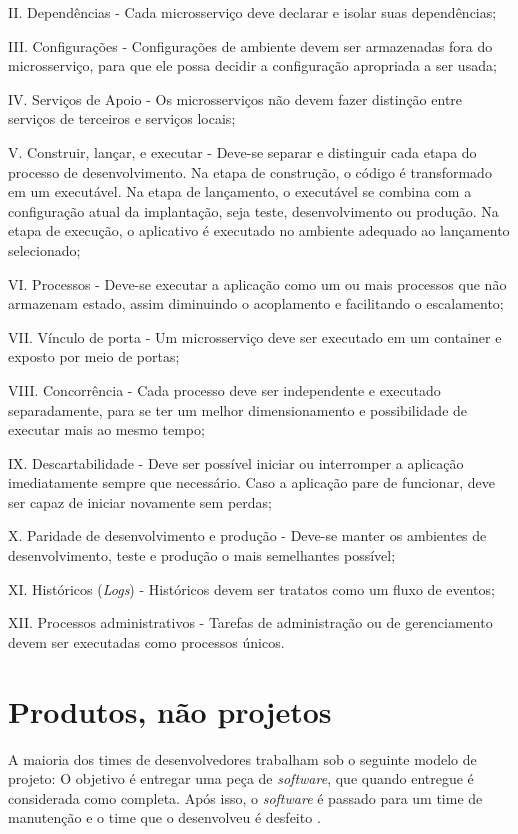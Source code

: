 II. Dependências - Cada microsserviço deve declarar e isolar suas dependências;

III. Configurações - Configurações de ambiente devem ser armazenadas fora do microsserviço, para que ele possa decidir a configuração apropriada a ser usada;

IV. Serviços de Apoio - Os microsserviços não devem fazer distinção entre serviços de terceiros e serviços locais;

V. Construir, lançar, e executar - Deve-se separar e distinguir cada etapa do processo de desenvolvimento. Na etapa de construção, o código é transformado em um executável. Na etapa de lançamento, o executável se combina com a configuração atual da implantação, seja teste, desenvolvimento ou produção. Na etapa de execução, o aplicativo é executado no ambiente adequado ao lançamento selecionado;

VI. Processos - Deve-se executar a aplicação como um ou mais processos que não armazenam estado, assim diminuindo o acoplamento e facilitando o escalamento;

VII. Vínculo de porta - Um microsserviço deve ser executado em um container e exposto por meio de portas;

VIII. Concorrência - Cada processo deve ser independente e executado separadamente, para se ter um melhor dimensionamento e possibilidade de executar mais ao mesmo tempo;

IX. Descartabilidade - Deve ser possível iniciar ou interromper a aplicação imediatamente sempre que necessário. Caso a aplicação pare de funcionar, deve ser capaz de iniciar novamente sem perdas;

X. Paridade de desenvolvimento e produção - Deve-se manter os ambientes de desenvolvimento, teste e produção o mais semelhantes possível;

XI. Históricos (\emph{Logs}) - Históricos devem ser tratatos como um fluxo de eventos;

XII. Processos administrativos - Tarefas de administração ou de gerenciamento devem ser executadas como processos únicos.

\section{Produtos, não projetos}

A maioria dos times de desenvolvedores trabalham sob o seguinte modelo de projeto: O objetivo é entregar uma peça de \emph{software}, que quando entregue é considerada como completa. Após isso, o \emph{software} é passado para um time de manutenção e o time que o desenvolveu é desfeito \cite{martin-fowler-microservices}.

